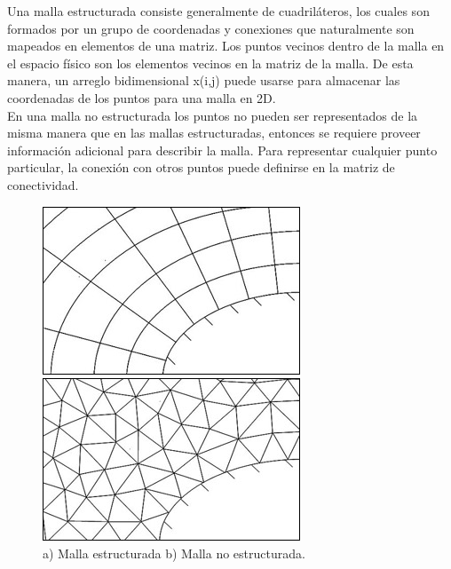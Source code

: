 \documentclass[11pt,letterpaper]{article}
\begin{document}
 



Una malla estructurada consiste generalmente de cuadriláteros, los cuales son formados por un grupo de coordenadas y conexiones que naturalmente son mapeados en elementos de una matriz. Los puntos vecinos dentro de la malla en el espacio físico son los elementos vecinos en la matriz de la malla. De esta manera, un arreglo bidimensional x(i,j) puede usarse para almacenar las coordenadas de los puntos para una malla en 2D.\\

En una malla no estructurada los puntos no pueden ser representados de la misma manera que en las mallas estructuradas, entonces se requiere proveer información adicional para describir la malla. Para representar cualquier punto particular, la conexión con otros puntos puede definirse en la matriz de conectividad.

\begin{figure}[H]
	\begin{minipage}{.49\linewidth}
		\centering
		\includegraphics[scale=0.5]{./imgs/mallaEstructurada.jpg}
	\end{minipage}
	\begin{minipage}{.49\linewidth}
		\centering
		\includegraphics[scale=0.519]{./imgs/mallaNoEstructurada.jpg}
	\end{minipage}
	\caption{a) Malla estructurada b) Malla no estructurada.}
\end{figure}
\end{document}
